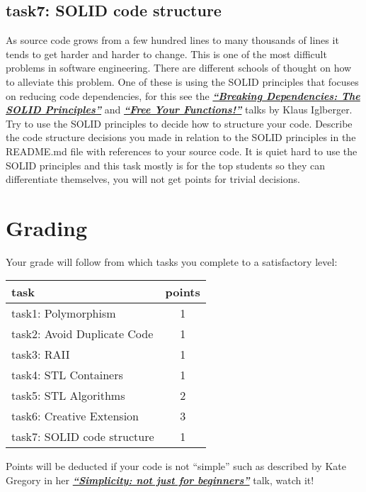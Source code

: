 \documentclass[12pt]{article}
\newcommand*{\link}[2]{\href{#1}{\color{blue}\textbf{\textit{#2}}}}
\begin{document}
\subsection{task7: SOLID code structure}
As source code grows from a few hundred lines to many thousands of
lines it tends to get harder and harder to change. This is one of the
most difficult problems in software engineering. There are different
schools of thought on how to alleviate this problem. One of these is
using the SOLID principles that focuses on reducing code dependencies,
for this see the \link{https://www.youtube.com/watch?v=Ntraj80qN2k}
{``Breaking Dependencies: The SOLID Principles''} and
\link{https://www.youtube.com/watch?v=WLDT1lDOsb4} {``Free Your
  Functions!''} talks by Klaus Iglberger. Try to use the SOLID
principles to decide how to structure your code. Describe the code
structure decisions you made in relation to the SOLID principles in
the README.md file with references to your source code. It is quiet
hard to use the SOLID principles and this task mostly is for the top
students so they can differentiate themselves, you will not get points
for trivial decisions.

\section{Grading}
Your grade will follow from which tasks you complete to a satisfactory
level:
\begin{center}
\begin{tabular}{ |l|c| } 
  \hline
  \textbf{task}               &  \textbf{points}\\ \hline
  task1: Polymorphism         &               1 \\
  task2: Avoid Duplicate Code &               1 \\
  task3: RAII                 &               1 \\
  task4: STL Containers       &               1 \\
  task5: STL Algorithms       &               2 \\
  task6: Creative Extension   &               3 \\
  task7: SOLID code structure &               1 \\
  \hline
\end{tabular}
\end{center}

Points will be deducted if your code is not ``simple'' such as
described by Kate Gregory in her
\link{https://www.youtube.com/watch?v=n0Ak6xtVXno} {``Simplicity: not
  just for beginners''} talk, watch it!
\end{document}
